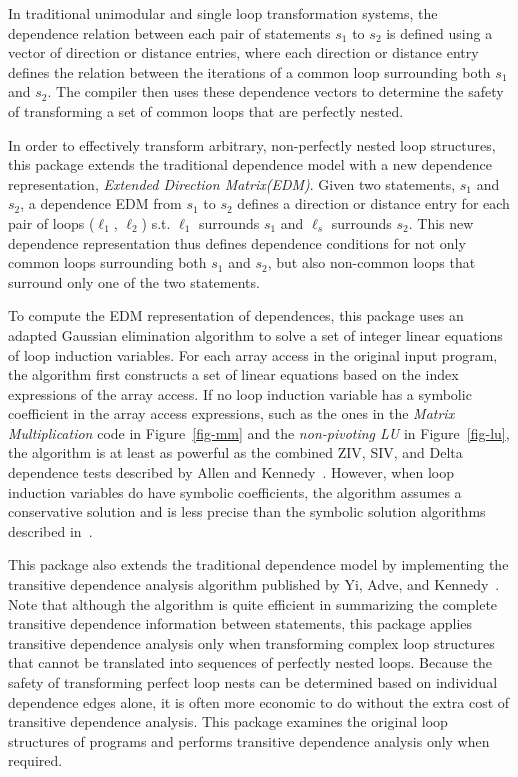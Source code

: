 In traditional unimodular and single loop transformation systems,
the dependence relation between each pair of statements $s_1$ to $s_2$ is 
defined using a vector of direction or distance entries, where
each direction or distance entry defines the relation between
the iterations of a common loop surrounding both $s_1$ and $s_2$.
The compiler then uses these dependence vectors to determine
the safety of transforming a set of common loops that are perfectly
nested.

In order to effectively transform arbitrary, non-perfectly nested
loop structures, this package extends the traditional dependence model 
with a new dependence representation,
{\em Extended Direction Matrix(EDM)}.
Given two statements, $s_1$ and $s_2$, a dependence EDM from $s_1$
to $s_2$ defines a direction or distance entry for each pair of 
loops ($\ell_1$, $\ell_2$) s.t. $\ell_1$ surrounds $s_1$ and
$\ell_s$ surrounds $s_2$. This new dependence representation
thus defines dependence conditions for not only common loops
surrounding both $s_1$ and $s_2$, but also non-common loops that
surround only one of the two statements.

To compute the EDM representation of dependences, this package uses
an adapted Gaussian elimination algorithm to solve a set of integer linear
equations of loop induction variables.  
For each array access in the original input program, the algorithm
first constructs a set of linear equations based on the index expressions
of the array access.  If no loop induction variable has 
a symbolic coefficient in the array access expressions, such as the 
ones in the {\it Matrix Multiplication} code in
Figure~\ref {fig-mm} and the {\it non-pivoting LU} in Figure~\ref {fig-lu}, 
the algorithm is at least as powerful as the combined ZIV, SIV, and Delta dependence 
tests described by Allen and Kennedy~\cite{AK:Book, Wolfe:Book}. 
However, when loop induction variables do have symbolic coefficients, 
the algorithm assumes a conservative solution and is less precise 
than the symbolic solution algorithms described in~\cite{AK:Book, Wolfe:Book}.

This package also extends the traditional dependence model 
by implementing the transitive dependence analysis algorithm
published by Yi, Adve, and Kennedy~\cite{YAK:PLDI00}.
Note that although the algorithm is quite efficient in summarizing the complete
transitive dependence information between statements,
this package applies transitive dependence analysis only
when  transforming complex loop structures that cannot
be translated into sequences of perfectly nested loops.
Because the safety of transforming perfect loop nests
can be determined based on individual dependence edges
alone, it is often more economic to do without the extra
cost of transitive dependence analysis.
This package examines the original loop structures
of programs and performs transitive dependence analysis only
when required.

